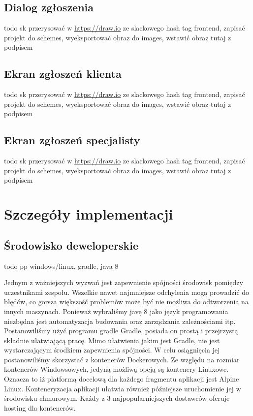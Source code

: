 \documentclass[10pt, titlepage, oneside, a4paper]{article}
\begin{document}
	\subsection{Dialog zgłoszenia}	
	todo sk przerysować w \url{https://draw.io} ze slackowego hash tag frontend, zapisać projekt do schemes, wyeksportować obraz do images, wstawić obraz tutaj z podpisem	
	
	\subsection{Ekran zgłoszeń klienta}
	todo sk przerysować w \url{https://draw.io} ze slackowego hash tag frontend, zapisać projekt do schemes, wyeksportować obraz do images, wstawić obraz tutaj z podpisem
	
	\subsection{Ekran zgłoszeń specjalisty}
	todo sk przerysować w \url{https://draw.io} ze slackowego hash tag frontend, zapisać projekt do schemes, wyeksportować obraz do images, wstawić obraz tutaj z podpisem  
  
	\section{Szczegóły implementacji}  
  
	\subsection{Środowisko deweloperskie}  
	todo pp windows/linux, gradle, java 8

	Jednym z ważniejszych wyzwań jest zapewnienie spójności środowisk pomiędzy uczestnikami zespołu. Wszelkie
	nawet najmniejsze odchylenia mogą prowadzić do błędów, co gorsza większość problemów może być nie możliwa
	do odtworzenia na innych maszynach. Ponieważ wybraliśmy javę 8 jako język programowania niezbędna jest
	automatyzacja budowania oraz zarządzania zależnościami itp. Postanowiliśmy użyć programu gradle Gradle,
	posiada on prostą i przejrzystą składnie ułatwiającą pracę. Mimo ułatwienia jakim jest Gradle, nie jest
	wystarczającym środkiem zapewnienia spójności. W celu osiągnięcia jej postanowiliśmy skorzystać z
	kontenerów Dockerowych. Ze względu na rozmiar kontenerów Windowsowych, jedyną możliwą opcją są kontenery
	Linuxowe. Oznacza to iż platformą docelową dla każdego fragmentu aplikacji jest Alpine Linux. Konteneryzacja
	aplikacji ułatwia również późniejsze uruchomienie jej w środowisku chmurowym. Każdy z 3 najpopularniejszych
	dostawców oferuje hosting dla kontenerów.
  
\end{document}
